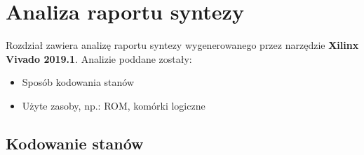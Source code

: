 \documentclass[12pt] {article}
\begin{document}
\newpage
\section{Analiza raportu syntezy}

Rozdział zawiera analizę raportu syntezy wygenerowanego przez narzędzie \textbf{Xilinx Vivado 2019.1}. Analizie poddane zostały:
\begin{itemize}
\item Sposób kodowania stanów
\item Użyte zasoby, np.: ROM, komórki logiczne
\end{itemize}

\subsection{Kodowanie stanów}
\end{document}
